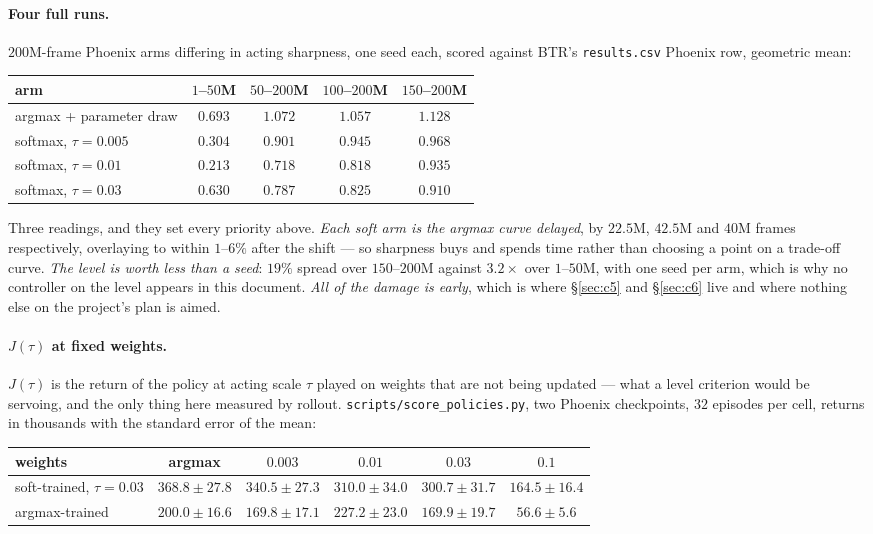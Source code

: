 \documentclass{article}
\begin{document}
\paragraph{Four full runs.} $200$M-frame Phoenix arms differing in acting sharpness, one seed
each, scored against BTR's \texttt{results.csv} Phoenix row, geometric mean:

\begin{center}
\begin{tabular}{lcccc}
  \toprule
  arm & $1$--$50$M & $50$--$200$M & $100$--$200$M & $150$--$200$M \\
  \midrule
  argmax + parameter draw & $\bm{0.693}$ & $\bm{1.072}$ & $\bm{1.057}$ & $\bm{1.128}$ \\
  softmax, $\tau = 0.005$ & $0.304$ & $0.901$ & $0.945$ & $0.968$ \\
  softmax, $\tau = 0.01$  & $0.213$ & $0.718$ & $0.818$ & $0.935$ \\
  softmax, $\tau = 0.03$  & $0.630$ & $0.787$ & $0.825$ & $0.910$ \\
  \bottomrule
\end{tabular}
\end{center}

Three readings, and they set every priority above. \emph{Each soft arm is the argmax curve
delayed}, by $22.5$M, $42.5$M and $40$M frames respectively, overlaying to within $1$--$6\%$ after
the shift --- so sharpness buys and spends time rather than choosing a point on a trade-off curve.
\emph{The level is worth less than a seed}: $19\%$ spread over $150$--$200$M against $3.2\times$
over $1$--$50$M, with one seed per arm, which is why no controller on the level appears in this
document. \emph{All of the damage is early}, which is where \S\ref{sec:c5} and \S\ref{sec:c6}
live and where nothing else on the project's plan is aimed.

\paragraph{$J(\tau)$ at fixed weights.} $J(\tau)$ is the return of the policy at acting scale
$\tau$ played on weights that are not being updated --- what a level criterion would be servoing,
and the only thing here measured by rollout. \texttt{scripts/score\_policies.py}, two Phoenix
checkpoints, $32$ episodes per cell, returns in thousands with the standard error of the mean:

\begin{center}
\small
\setlength{\tabcolsep}{4.5pt}
\begin{tabular}{lccccc}
  \toprule
  weights & argmax & $0.003$ & $0.01$ & $0.03$ & $0.1$ \\
  \midrule
  soft-trained, $\tau = 0.03$ & $\bm{368.8}\pm27.8$ & $340.5\pm27.3$ & $310.0\pm34.0$
                              & $300.7\pm31.7$ & $164.5\pm16.4$ \\
  argmax-trained              & $200.0\pm16.6$ & $169.8\pm17.1$ & $\bm{227.2}\pm23.0$
                              & $169.9\pm19.7$ & $56.6\pm5.6$ \\
  \bottomrule
\end{tabular}
\end{center}
\end{document}
